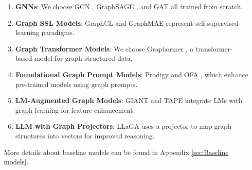 
\begin{enumerate}
\item \textbf{GNNs}: We choose GCN \cite{gcn}, GraphSAGE \cite{graphsage}, and GAT \cite{gat} all trained from scratch.
\item \textbf{Graph SSL Models}: GraphCL \cite{you2020graphcl} and GraphMAE \cite{hou2022graphmae} represent self-supervised learning paradigms.
\item \textbf{Graph Transformer Models}: We choose Graphormer \cite{graphormer}, a transformer-based model for graph-structured data.
\item \textbf{Foundational Graph Prompt Models}: Prodigy \cite{huang2024prodigy} and OFA \cite{ofa}, which enhance pre-trained models using graph prompts.
\item \textbf{LM-Augmented Graph Models}: GIANT \cite{giant} and TAPE \cite{tape} integrate LMs with graph learning for feature enhancement.
\item \textbf{LLM with Graph Projectors}: LLaGA \cite{chen2024llaga} uses a projector to map graph structures into vectors for improved reasoning.
\end{enumerate}
More details about baseline models can be found in Appendix \ref{sec:Baseline models}.


